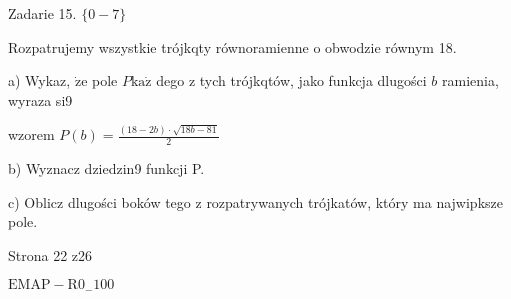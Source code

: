 \documentclass[a4paper,12pt]{article}
\begin{document}
Zadarie 15. $\{0-7\}$

Rozpatrujemy wszystkie trójkqty równoramienne o obwodzie równym 18.

a) Wykaz, $\dot{\mathrm{z}}\mathrm{e}$ pole $P \mathrm{k}\mathrm{a}\dot{\mathrm{z}}$ dego z tych trójkqtów, jako funkcja dlugości $b$ ramienia, wyraza si9

wzorem $P(b)=\displaystyle \frac{(18-2b)\cdot\sqrt{18b-81}}{2}$

b) Wyznacz dziedzin9 funkcji P.

c) Oblicz dlugości boków tego z rozpatrywanych trójkatów, który ma najwipksze pole.

Strona 22 z26

$\mathrm{E}\mathrm{M}\mathrm{A}\mathrm{P}-\mathrm{R}0_{-}100$
\end{document}
